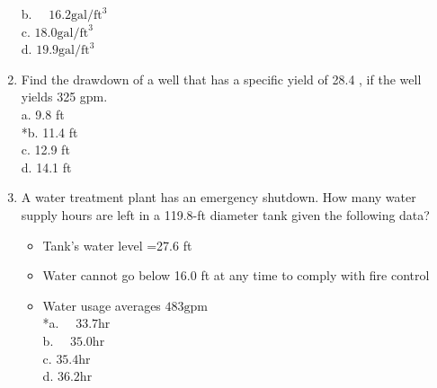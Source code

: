 \begin{enumerate}
b. $\quad 16.2 \mathrm{gal} / \mathrm{ft}^{3}$\\
c. $18.0 \mathrm{gal} / \mathrm{ft}^{3}$\\
d. $19.9 \mathrm{gal} / \mathrm{ft}^{3}$\\
  \item Find the drawdown of a well that has a specific yield of 28.4 , if the well yields 325 gpm.\\
a. 9.8 ft\\
*b. 11.4 ft\\
c. 12.9 ft\\
d. 14.1 ft\\
  \item A water treatment plant has an emergency shutdown. How many water supply hours are left in a 119.8-ft diameter tank given the following data?\\

\begin{itemize}
  \item Tank's water level =27.6 ft\\
  \item Water cannot go below 16.0 ft at any time to comply with fire control\\
  \item Water usage averages $483 \mathrm{gpm}$\\
*a. $\quad 33.7 \mathrm{hr}$\\
b. $\quad 35.0 \mathrm{hr}$\\
c. $35.4 \mathrm{hr}$\\
d. $36.2 \mathrm{hr}$\\
\end{itemize}


\end{enumerate}
